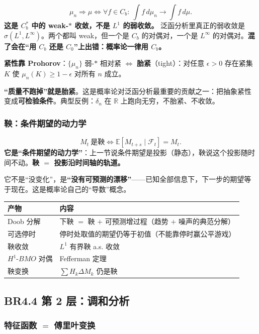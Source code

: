 \[
\mu_n\Rightarrow\mu\iff\forall f\in C_b:\ \int f\,d\mu_n\to\int f\,d\mu .
\]
\textbf{这是 $C_b^*$ 中的 weak-$*$ 收敛，不是 $L^1$ 的弱收敛。} 泛函分析里真正的弱收敛是 $\sigma(L^1,L^\infty)$。两个都叫 weak，但一个是 $C_b$ 的对偶对，一个是 $L^\infty$ 的对偶对。\textbf{混了会在“用 $C_b$ 还是 $C_0$”上出错：概率论一律用 $C_b$。}

\textbf{紧性靠 Prohorov}：$\{\mu_n\}$ 弱-$*$ 相对紧 $\iff$ \textbf{胎紧}（tight）：对任意 $\epsilon>0$ 存在紧集 $K$ 使 $\mu_n(K)\ge1-\epsilon$ 对所有 $n$ 成立。

\textbf{“质量不跑掉”就是胎紧}。这是概率论对泛函分析最重要的贡献之一：把抽象紧性变成\textbf{可检验条件}。典型反例：$\delta_n$ 在 $\mathbb{R}$ 上跑向无穷，不胎紧、不收敛。

\subsubsection{鞅：条件期望的动力学}

\[
M_t\ \text{是鞅}\iff\mathbb{E}[M_{t+s}\mid\mathcal{F}_t]=M_t .
\]
\textbf{它是“条件期望的动力学”}：上一节说条件期望是投影（静态），鞅说这个投影随时间不动。\textbf{鞅 $=$ 投影沿时间轴的轨道。}

它不是“没变化”，是\textbf{“没有可预测的漂移”}——已知全部信息下，下一步的期望等于现在。这是概率论自己的“导数”概念。

\begin{center}
\begin{tabular}{L{3.4cm}L{9cm}}
\toprule
\textbf{产物} & \textbf{内容} \\
\midrule
Doob 分解 & 下鞅 $=$ 鞅 $+$ 可预测增过程（趋势 $+$ 噪声的典范分解） \\
可选停时 & 停时处取值的期望仍等于初值（不能靠停时赢公平游戏） \\
鞅收敛 & $L^1$ 有界鞅 a.s. 收敛 \\
$H^1$-$BMO$ 对偶 & Fefferman 定理 \\
鞅变换 & $\sum H_k\Delta M_k$ 仍是鞅 \\
\bottomrule
\end{tabular}
\end{center}

\subsection{BR4.4 第 2 层：调和分析}

\subsubsection{特征函数 $=$ 傅里叶变换}

